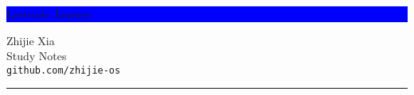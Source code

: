 \begin{titlepage} %
	
	
	\colorbox{blue}{
		\parbox[t]{0.93\textwidth}{ %
			\parbox[t]{0.91\textwidth}{ %
				\raggedleft %
				\fontsize{50pt}{80pt}\selectfont %
				\vspace{0.4cm} %
				
				Leetcode Journey
				
				\vspace{0.4cm} %
			}
		}
	}
	
	\vfill %
	
	
	\parbox[t]{0.93\textwidth}{ %
		\raggedleft %
		\large %
		{\Large Zhijie Xia}\\[4pt] %
		Study Notes\\
		\texttt{github.com/zhijie-os}\\
		
		\hfill\rule{0.2\linewidth}{1pt}%
	}
	
\end{titlepage}